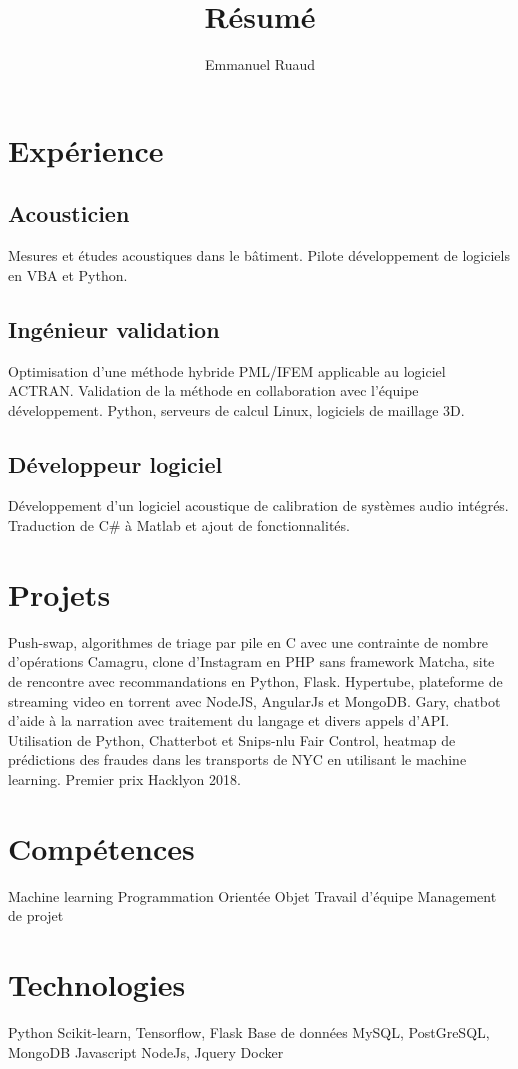 \documentclass{article}
\renewcommand{\maketitle}
{
\begin{center}
\huge\bfseries
\theauthor
\end{center}
}
\begin{document}
\title{R\'esum\'e}
\author{Emmanuel Ruaud}

\maketitle

\section{Exp\'erience}
\subsection{Acousticien}
Mesures et \'etudes acoustiques dans le b\^atiment. Pilote d\'eveloppement de logiciels en VBA et Python.
\subsection{Ing\'enieur validation}
Optimisation d'une m\'ethode hybride PML/IFEM applicable au logiciel ACTRAN. Validation de la m\'ethode en collaboration avec l'\'equipe d\'eveloppement. Python, serveurs de calcul Linux, logiciels de maillage 3D.
\subsection{D\'eveloppeur logiciel}
D\'eveloppement d'un logiciel acoustique de calibration de syst\`emes audio int\'egr\'es. Traduction de C\# \`a Matlab et ajout de fonctionnalit\'es.
\section{Projets}
Push-swap, algorithmes de triage par pile en C avec une contrainte de nombre d'op\'erations
Camagru, clone d'Instagram en PHP sans framework
Matcha, site de rencontre avec recommandations en Python, Flask.
Hypertube, plateforme de streaming video en torrent avec NodeJS, AngularJs et MongoDB.
Gary, chatbot d'aide \`a la narration avec traitement du langage et divers appels d'API. Utilisation de Python, Chatterbot et Snips-nlu
Fair Control, heatmap de pr\'edictions des fraudes dans les transports de NYC en utilisant le machine learning. Premier prix Hacklyon 2018.
\section{Comp\'etences}
Machine learning
Programmation Orient\'ee Objet Travail d'\'equipe
Management de projet
\section{Technologies}
Python Scikit-learn, Tensorflow, Flask
Base de donn\'ees MySQL, PostGreSQL, MongoDB
Javascript NodeJs, Jquery
Docker
\end{document}
